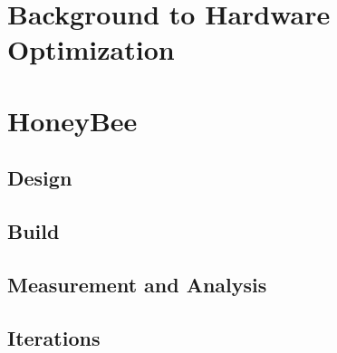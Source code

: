 
\section{Background to Hardware Optimization}

\section{HoneyBee}
    \subsection{Design}
    \subsection{Build}
    \subsection{Measurement and Analysis}
        
    \subsection{Iterations}